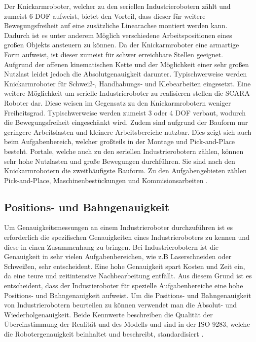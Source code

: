 Der Knickarmroboter, welcher zu den seriellen Industrierobotern zählt und zumeist 6 DOF aufweist, bietet den Vorteil, dass dieser für weitere Bewegungsfreiheit auf eine zusätzliche Linearachse montiert werden kann. Dadurch ist es unter anderem Möglich verschiedene Arbeitspositionen eines großen Objekts ansteuern zu können. Da der Knickarmroboter eine armartige Form aufweist, ist dieser zumeist für schwer erreichbare Stellen geeignet. Aufgrund der offenen kinematischen Kette und der Möglichkeit einer sehr großen Nutzlast leidet jedoch die Absolutgenauigkeit darunter. Typischwerweise werden Knickarmroboter für Schweiß-, Handhabungs- und Klebearbeiten eingesetzt. Eine weitere Möglichkeit um serielle Industrieroboter zu realisieren stellen die SCARA-Roboter dar. Diese weisen im Gegensatz zu den Knickarmrobotern weniger Freiheitsgrad. Typischwerweise werden zumeist 3 oder 4 DOF verbaut, wodurch die Bewegungsfreiheit eingeschänkt wird. Zudem sind aufgrund der Bauform nur geringere Arbeitslasten und kleinere Arbeitsbereiche nutzbar. Dies zeigt sich auch beim Aufgabenbereich, welcher großteils in der Montage und Pick-and-Place besteht. Portale, welche auch zu den seriellen Industrierobotern zählen, können sehr hohe Nutzlasten und große Bewegungen durchführen. Sie sind nach den Knickarmrobotern die zweithäufigste Bauform. Zu den Aufgabengebieten zählen Pick-and-Place, Maschinenbestückungen und Kommisionsarbeiten \cite[17\psqq]{pott_industrielle_2019}.

\subsection{Positions- und Bahngenauigkeit}
Um Genauigkeitsmessungen an einem Industrieroboter durchzuführen ist es erforderlich die spezifischen Genauigkeiten eines Industrieroboters zu kennen und diese in einen Zusammenhang zu bringen. Bei Industrierobotern ist die Genauigkeit in sehr vielen Aufgabenbereichen, wie z.B Laserschneiden oder Schweißen, sehr entscheident. Eine hohe Genauigkeit spart Kosten und Zeit ein, da eine teure und zeitintensive Nachbearbeitung entfällt. Aus diesem Grund ist es entscheident, dass der Industieroboter für spezielle Aufgabenbereiche eine hohe Positions- und Bahngenauigkeit aufweist. Um die Positions- und Bahngenauigkeit von Industrierobotern beurteilen zu können verwendet man die Absolut- und Wiederholgenauigkeit. Beide Kennwerte beschreiben die Qualität der Übereinstimmung der Realität und des Modells und sind in der ISO 9283, welche die Robotergenauigkeit beinhaltet und beschreibt, standardisiert \cite[28\psqq]{pott_industrielle_2019}.


